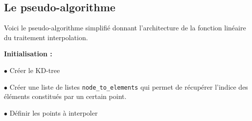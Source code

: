 \newpage
\subsection{Le pseudo-algorithme}


Voici le pseudo-algorithme simplifié donnant l'architecture de la fonction linéaire du traitement interpolation.

\vspace{0.5cm}

\textbf{Initialisation :}

$\bullet$ Créer le KD-tree

$\bullet$ Créer une liste de listes \texttt{node\_to\_elements} qui permet de récupérer l'indice des éléments constitués par un certain point.

$\bullet$ Définir les points à interpoler

\vspace{0.5cm}

